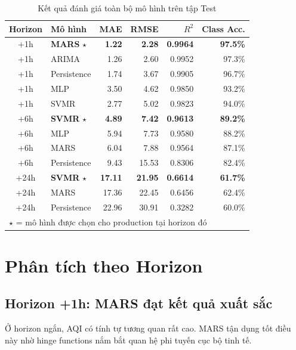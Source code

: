 \documentclass[12pt,a4paper]{report}
\begin{document}
\begin{table}[H]
\centering
\caption{Kết quả đánh giá toàn bộ mô hình trên tập Test}
\label{tab:results_full}
\begin{tabular}{clrrrr}
\toprule
\textbf{Horizon} & \textbf{Mô hình} & \textbf{MAE} & \textbf{RMSE} & \textbf{$R^2$} & \textbf{Class Acc.} \\
\midrule
\rowcolor{green!12}
+1h & \textbf{MARS} $\star$ & \textbf{1.22} & \textbf{2.28} & \textbf{0.9964} & \textbf{97.5\%} \\
+1h & ARIMA         & 1.26 & 2.60  & 0.9952 & 97.3\% \\
+1h & Persistence   & 1.74 & 3.67  & 0.9905 & 96.7\% \\
+1h & MLP           & 3.50 & 4.62  & 0.9850 & 93.2\% \\
+1h & SVMR          & 2.77 & 5.02  & 0.9823 & 94.0\% \\
\midrule
\rowcolor{green!12}
+6h & \textbf{SVMR} $\star$ & \textbf{4.89} & \textbf{7.42} & \textbf{0.9613} & \textbf{89.2\%} \\
+6h & MLP           & 5.94 & 7.73  & 0.9580 & 88.2\% \\
+6h & MARS          & 6.04 & 7.88  & 0.9564 & 87.1\% \\
+6h & Persistence   & 9.43 & 15.53 & 0.8306 & 82.4\% \\
\midrule
\rowcolor{green!12}
+24h & \textbf{SVMR} $\star$ & \textbf{17.11} & \textbf{21.95} & \textbf{0.6614} & \textbf{61.7\%} \\
+24h & MARS          & 17.36 & 22.45 & 0.6456 & 62.4\% \\
+24h & Persistence   & 22.96 & 30.91 & 0.3282 & 60.0\% \\
\bottomrule
\multicolumn{6}{l}{\small $\star$ = mô hình được chọn cho production tại horizon đó}
\end{tabular}
\end{table}

\section{Phân tích theo Horizon}

\subsection{Horizon +1h: MARS đạt kết quả xuất sắc}

Ở horizon ngắn, AQI có tính tự tương quan rất cao. MARS tận dụng tốt điều này nhờ hinge functions nắm bắt quan hệ phi tuyến cục bộ tinh tế.
\end{document}

